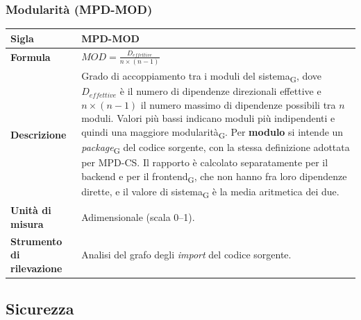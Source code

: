 \documentclass[a4paper, 10pt]{article}
\begin{document}
\vspace{0.8cm}

\subsubsection{Modularità (MPD-MOD)}
\noindent
\begin{minipage}{\textwidth}
    \begin{tabularx}{\textwidth}{|>{\columncolor{bluBitless!10}\bfseries}p{3.5cm}|X|}
        \hline
        Sigla & MPD-MOD \\ \hline
        Formula &
        \textit{$MOD = \frac{D_{effettive}}{n \times (n-1)}$} \\ \hline
        Descrizione & Grado di accoppiamento tra i moduli del sistema\textsubscript{G}, dove $D_{effettive}$ è il numero di dipendenze direzionali effettive e $n \times (n-1)$ il numero massimo di dipendenze possibili tra $n$ moduli. Valori più bassi indicano moduli più indipendenti e quindi una maggiore modularità\textsubscript{G}. Per \textbf{modulo} si intende un \textit{package}\textsubscript{G} del codice sorgente, con la stessa definizione adottata per MPD-CS. Il rapporto è calcolato separatamente per il backend e per il frontend\textsubscript{G}, che non hanno fra loro dipendenze dirette, e il valore di sistema\textsubscript{G} è la media aritmetica dei due. \\ \hline
        Unità di misura & Adimensionale (scala 0--1). \\ \hline
        Strumento di rilevazione & Analisi del grafo degli \textit{import} del codice sorgente. \\ \hline
    \end{tabularx}
\end{minipage}

\vspace{0.8cm}

\subsection{Sicurezza}
\end{document}

